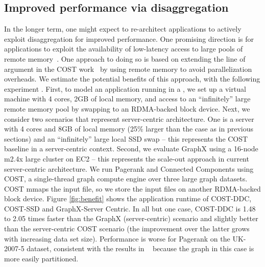 \subsection{Improved performance via disaggregation}
In the longer term, one might expect to re-architect applications to actively exploit disaggregation for improved performance.
One promising direction is for applications to exploit the availability of low-latency access to large pools of remote memory~\cite{ddcHwDesign1}. 
One approach to doing so is based on extending the line of argument in the COST work~\cite{cost} by using remote memory to avoid parallelization overheads.
We estimate the potential benefits of this approach, with the following experiment .
First, to model an application running in a \dis, we set up a virtual machine with 4 cores,  2GB of local memory, and access to an ``infinitely'' large remote memory pool by swapping to an RDMA-backed block device. 
Next, we consider two scenarios that represent server-centric architecture.
One is a server with 4 cores and 8GB of local memory (25\% larger than the \dis case as in previous sections) and an ``infinitely'' large local SSD swap -- this represents the COST baseline in a server-centric context. 
Second, we evaluate GraphX using a 16-node m2.4x large cluster on EC2 -- this represents the scale-out approach in current server-centric architecture.
We run Pagerank and Connected Components using COST, a single-thread graph compute engine over three large graph datasets. COST mmaps the input file, so we store the input files on another RDMA-backed block device.
Figure \ref{fig:benefit} shows the application runtime of COST-DDC, COST-SSD and GraphX-Server Centric.
In all but one case, COST-DDC is 1.48 to 2.05 times faster than the GraphX (server-centric) scenario and slightly better than the server-centric COST scenario (the improvement over the latter grows with increasing data set size). Performance is worse for Pagerank on the UK-2007-5 dataset, consistent with the results in ~\cite{cost} because the graph in this case is more easily partitioned. 



